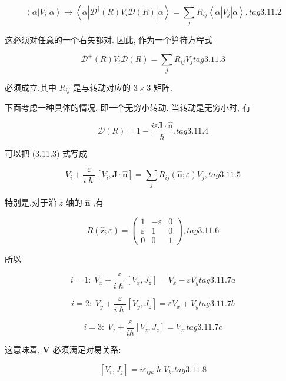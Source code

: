 $$
\left\langle {\alpha \left| {V}_{i}\right| \alpha }\right\rangle \rightarrow \left\langle {\alpha \left| {{\mathcal{D}}^{ \dagger }\left( R\right) {V}_{i}\mathcal{D}\left( R\right) }\right| \alpha }\right\rangle = \mathop{\sum }\limits_{j}{R}_{ij}\left\langle {\alpha \left| {V}_{j}\right| \alpha }\right\rangle , tag{3.11.2}
$$

这必须对任意的一个右矢都对. 因此, 作为一个算符方程式

$$
{\mathcal{D}}^{ + }\left( R\right) {V}_{i}\mathcal{D}\left( R\right) = \mathop{\sum }\limits_{j}{R}_{ij}{V}_{j} tag{3.11.3}
$$

必须成立,其中 ${R}_{ij}$ 是与转动对应的 $3 \times 3$ 矩阵.

下面考虑一种具体的情况, 即一个无穷小转动. 当转动是无穷小时, 有

$$
\mathcal{D}\left( R\right) = 1 - \frac{{i\varepsilon }\mathbf{J} \cdot \widehat{\mathbf{n}}}{\hslash }. tag{3.11.4}
$$

可以把 (3.11.3) 式写成

$$
{V}_{i} + \frac{\varepsilon }{i\hslash }\left\lbrack {{V}_{i},\mathbf{J} \cdot \widehat{\mathbf{n}}}\right\rbrack = \mathop{\sum }\limits_{j}{R}_{ij}\left( {\widehat{\mathbf{n}};\varepsilon }\right) {V}_{j}, tag{3.11.5}
$$

特别是,对于沿 $z$ 轴的 $\widehat{\mathbf{n}}$ ,有

$$
R\left( {\widehat{\mathbf{z}};\varepsilon }\right) = \left( \begin{matrix} 1 & - \varepsilon & 0 \\ \varepsilon & 1 & 0 \\ 0 & 0 & 1 \end{matrix}\right) , tag{3.11.6}
$$

所以

$$
i = 1 : \;{V}_{x} + \frac{\varepsilon }{i\hslash }\left\lbrack {{V}_{x},{J}_{z}}\right\rbrack = {V}_{x} - \varepsilon {V}_{y} tag{3.11.7a}
$$

$$
i = 2 : \;{V}_{y} + \frac{\varepsilon }{i\hslash }\left\lbrack {{V}_{y},{J}_{z}}\right\rbrack = \varepsilon {V}_{x} + {V}_{y} tag{3.11.7b}
$$

$$
i = 3 : \;{V}_{z} + \frac{\varepsilon }{ih}\left\lbrack {{V}_{z},{J}_{z}}\right\rbrack = {V}_{z}. tag{3.11.7c}
$$

这意味着, $\mathbf{V}$ 必须满足对易关系:

$$
\left\lbrack {{V}_{i},{J}_{j}}\right\rbrack = i{\varepsilon }_{ijk}\hslash {V}_{k}. tag{3.11.8}
$$

